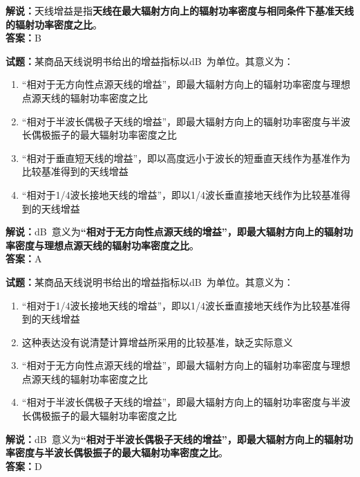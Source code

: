 \documentclass{ctexbook}
\begin{document}
\noindent\textbf{解说：}天线增益是指\textbf{天线在最大辐射方向上的辐射功率密度与相同条件下基准天线的辐射功率密度之比}。\\\noindent\textbf{答案：}B

\vspace{\baselineskip}

\noindent\textbf{试题：}某商品天线说明书给出的增益指标以\unit[qualifier-mode=combine]{\deci\bel{}}为单位。其意义为：
\begin{enumerate}[leftmargin=3em]
  \item “相对于无方向性点源天线的增益”，即最大辐射方向上的辐射功率密度与理想点源天线的辐射功率密度之比
  \item “相对于半波长偶极子天线的增益”，即最大辐射方向上的辐射功率密度与半波长偶极振子的最大辐射功率密度之比
  \item “相对于垂直短天线的增益”，即以高度远小于波长的短垂直天线作为基准作为比较基准得到的天线增益
  \item “相对于1/4波长接地天线的增益”，即以1/4波长垂直接地天线作为比较基准得到的天线增益
\end{enumerate}

\noindent\textbf{解说：}\unit[qualifier-mode=combine]{\deci\bel{}}意义为\textbf{“相对于无方向性点源天线的增益”，即最大辐射方向上的辐射功率密度与理想点源天线的辐射功率密度之比}。\\\noindent\textbf{答案：}A

\vspace{\baselineskip}

\noindent\textbf{试题：}某商品天线说明书给出的增益指标以\unit[qualifier-mode=combine]{\deci\bel{}}为单位。其意义为：

\begin{enumerate}[leftmargin=3em]
  \item “相对于1/4波长接地天线的增益”，即以1/4波长垂直接地天线作为比较基准得到的天线增益
  \item 这种表达没有说清楚计算增益所采用的比较基准，缺乏实际意义
  \item “相对于无方向性点源天线的增益”，即最大辐射方向上的辐射功率密度与理想点源天线的辐射功率密度之比
  \item “相对于半波长偶极子天线的增益”，即最大辐射方向上的辐射功率密度与半波长偶极振子的最大辐射功率密度之比
\end{enumerate}

\noindent\textbf{解说：}\unit[qualifier-mode=combine]{\deci\bel{}}意义为\textbf{“相对于半波长偶极子天线的增益”，即最大辐射方向上的辐射功率密度与半波长偶极振子的最大辐射功率密度之比}。\\\noindent\textbf{答案：}D
\end{document}
